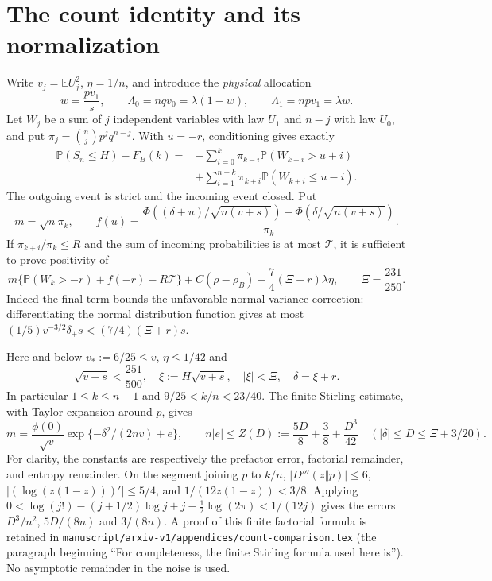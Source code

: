 \documentclass[11pt,a4paper]{article}
\newcommand{\E}{\mathbb E}\newcommand{\Pp}{\mathbb P}
\begin{document}
\section{The count identity and its normalization}
Write $v_j=\E U_j^2$, $\eta=1/n$, and introduce the \emph{physical} allocation
\[
 w=\frac{pv_1}{s},\qquad \Lambda_0=nqv_0=\lambda(1-w),\qquad
 \Lambda_1=npv_1=\lambda w.
\]
Let $W_j$ be a sum of $j$ independent variables with law $U_1$ and
$n-j$ with law $U_0$, and put $\pi_j=\binom njp^jq^{n-j}$.
With $u=-r$, conditioning gives exactly
\begin{align*}
 \Pp(S_n\le H)-F_B(k)
 ={}&-\sum_{i=0}^{k}\pi_{k-i}\Pp(W_{k-i}>u+i)\\
 &+\sum_{i=1}^{n-k}\pi_{k+i}\Pp(W_{k+i}\le u-i).
\end{align*}
The outgoing event is strict and the incoming event closed. Put
\[
 m=\sqrt n\pi_k,\qquad
 f(u)=\frac{\Phi((\delta+u)/\sqrt{n(v+s)})-
                   \Phi(\delta/\sqrt{n(v+s)})}{\pi_k}.
\]
If $\pi_{k+i}/\pi_k\le R$ and the sum of incoming probabilities is at
most $\mathcal T$, it is sufficient to prove positivity of
\begin{equation}\label{eq:margin}
 m\{\Pp(W_k>-r)+f(-r)-R\mathcal T\}
       +C(\rho-\rho_B)-\frac74(\Xi+r)\lambda\eta,
 \qquad \Xi=\frac{231}{250}.
\end{equation}
Indeed the final term bounds the unfavorable normal variance correction:
differentiating the normal distribution function gives at most
$(1/5)v^{-3/2}\delta_+s<(7/4)(\Xi+r)s$.

Here and below $v_*:=6/25\le v$, $\eta\le1/42$ and
\[
 \sqrt{v+s}<\frac{251}{500},\quad
 \xi:=H\sqrt{v+s},\quad |\xi|<\Xi,\quad\delta=\xi+r.
\]
In particular $1\le k\le n-1$ and $9/25<k/n<23/40$.
The finite Stirling estimate, with Taylor expansion around $p$, gives
\begin{equation}\label{eq:stirling}
 m=\frac{\phi(0)}{\sqrt v}
 \exp\{-\delta^2/(2nv)+e\},\qquad
 n|e|\le Z(D):=\frac{5D}{8}+\frac38+\frac{D^3}{42}
 \quad (|\delta|\le D\le\Xi+3/20).
\end{equation}
For clarity, the constants are respectively the prefactor error, factorial
remainder, and entropy remainder. On the segment joining $p$ to $k/n$,
$|D'''(z\Vert p)|\le6$, $|(\log(z(1-z)))'|\le5/4$, and
$1/(12z(1-z))<3/8$. Applying
$0<\log(j!)-(j+1/2)\log j+j-\tfrac12\log(2\pi)<1/(12j)$
gives the errors $D^3/n^2$, $5D/(8n)$ and $3/(8n)$.
A proof of this finite factorial formula is retained in
\texttt{manuscript/arxiv-v1/appendices/count-comparison.tex}
(the paragraph beginning ``For completeness, the finite Stirling formula
used here is''). No asymptotic remainder in the noise is used.
\end{document}
